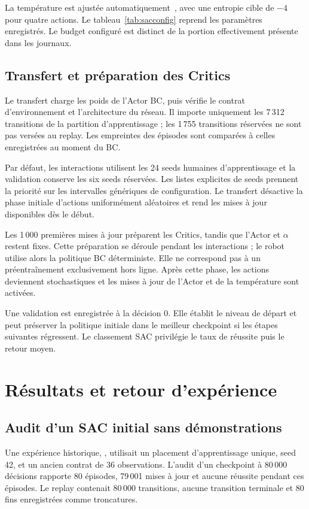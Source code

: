 \documentclass[conference,a4paper]{IEEEtran}
\newcommand{\code}[1]{\texttt{\detokenize{#1}}}
\begin{document}
La température est ajustée automatiquement~\cite{sacapplications}, avec une entropie cible de $-4$ pour quatre actions. Le tableau~\ref{tab:sacconfig} reprend les paramètres enregistrés. Le budget configuré est distinct de la portion effectivement présente dans les journaux.

\subsection{Transfert et préparation des Critics}
Le transfert charge les poids de l'Actor BC, puis vérifie le contrat d'environnement et l'architecture du réseau. Il importe uniquement les 7\,312 transitions de la partition d'apprentissage ; les 1\,755 transitions réservées ne sont pas versées au replay. Les empreintes des épisodes sont comparées à celles enregistrées au moment du BC.

Par défaut, les interactions utilisent les 24 seeds humaines d'apprentissage et la validation conserve les six seeds réservées. Les listes explicites de seeds prennent la priorité sur les intervalles génériques de configuration. Le transfert désactive la phase initiale d'actions uniformément aléatoires et rend les mises à jour disponibles dès le début.

Les 1\,000 premières mises à jour préparent les Critics, tandis que l'Actor et $\alpha$ restent fixes. Cette préparation se déroule pendant les interactions ; le robot utilise alors la politique BC déterministe. Elle ne correspond pas à un préentraînement exclusivement hors ligne. Après cette phase, les actions deviennent stochastiques et les mises à jour de l'Actor et de la température sont activées.

Une validation est enregistrée à la décision 0. Elle établit le niveau de départ et peut préserver la politique initiale dans le meilleur checkpoint si les étapes suivantes régressent. Le classement SAC privilégie le taux de réussite puis le retour moyen.

\section{Résultats et retour d'expérience}
\subsection{Audit d'un SAC initial sans démonstrations}
Une expérience historique, \code{sac_fixed_seed42}, utilisait un placement d'apprentissage unique, seed 42, et un ancien contrat de 36 observations. L'audit d'un checkpoint à 80\,000 décisions rapporte 80 épisodes, 79\,001 mises à jour et aucune réussite pendant ces épisodes. Le replay contenait 80\,000 transitions, aucune transition terminale et 80 fins enregistrées comme troncatures.
\end{document}
